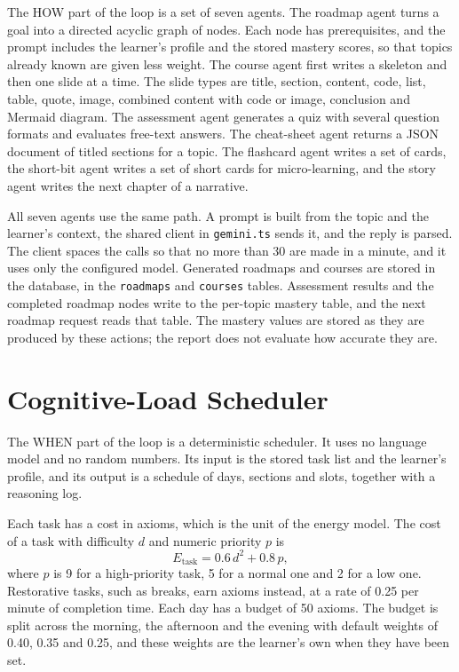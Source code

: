 The HOW part of the loop is a set of seven agents. The roadmap agent turns a goal into a directed acyclic graph of nodes. Each node has prerequisites, and the prompt includes the learner's profile and the stored mastery scores, so that topics already known are given less weight. The course agent first writes a skeleton and then one slide at a time. The slide types are title, section, content, code, list, table, quote, image, combined content with code or image, conclusion and Mermaid diagram. The assessment agent generates a quiz with several question formats and evaluates free-text answers. The cheat-sheet agent returns a JSON document of titled sections for a topic. The flashcard agent writes a set of cards, the short-bit agent writes a set of short cards for micro-learning, and the story agent writes the next chapter of a narrative.

All seven agents use the same path. A prompt is built from the topic and the learner's context, the shared client in \texttt{gemini.ts} sends it, and the reply is parsed. The client spaces the calls so that no more than 30 are made in a minute, and it uses only the configured model. Generated roadmaps and courses are stored in the database, in the \texttt{roadmaps} and \texttt{courses} tables. Assessment results and the completed roadmap nodes write to the per-topic mastery table, and the next roadmap request reads that table. The mastery values are stored as they are produced by these actions; the report does not evaluate how accurate they are.

\section{Cognitive-Load Scheduler}
\label{sec:axiom-scheduler}

The WHEN part of the loop is a deterministic scheduler. It uses no language model and no random numbers. Its input is the stored task list and the learner's profile, and its output is a schedule of days, sections and slots, together with a reasoning log.

Each task has a cost in axioms, which is the unit of the energy model. The cost of a task with difficulty $d$ and numeric priority $p$ is
\begin{equation}
  E_{\mathrm{task}} = 0.6\,d^{2} + 0.8\,p,
  \label{eq:axiom-cost}
\end{equation}
where $p$ is 9 for a high-priority task, 5 for a normal one and 2 for a low one. Restorative tasks, such as breaks, earn axioms instead, at a rate of 0.25 per minute of completion time. Each day has a budget of 50 axioms. The budget is split across the morning, the afternoon and the evening with default weights of 0.40, 0.35 and 0.25, and these weights are the learner's own when they have been set.

